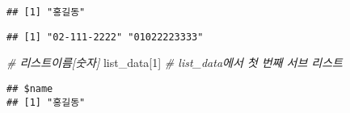 \documentclass[
]{article}
\newenvironment{Shaded}{\begin{snugshade}}{\end{snugshade}}
\newcommand{\CommentTok}[1]{\textcolor[rgb]{0.56,0.35,0.01}{\textit{#1}}}
\newcommand{\DecValTok}[1]{\textcolor[rgb]{0.00,0.00,0.81}{#1}}
\newcommand{\NormalTok}[1]{#1}
\newcommand{\SpecialCharTok}[1]{\textcolor[rgb]{0.00,0.00,0.00}{#1}}
\begin{document}
\begin{verbatim}
## [1] "홍길동"
\end{verbatim}

\begin{Shaded}
\end{Shaded}

\begin{verbatim}
## [1] "02-111-2222" "01022223333"
\end{verbatim}

\begin{Shaded}
\begin{Highlighting}[]
\CommentTok{\# 리스트이름[숫자]}
\NormalTok{list\_data[}\DecValTok{1}\NormalTok{]  }\CommentTok{\# list\_data에서 첫 번째 서브 리스트}
\end{Highlighting}
\end{Shaded}

\begin{verbatim}
## $name
## [1] "홍길동"
\end{verbatim}
\end{document}
